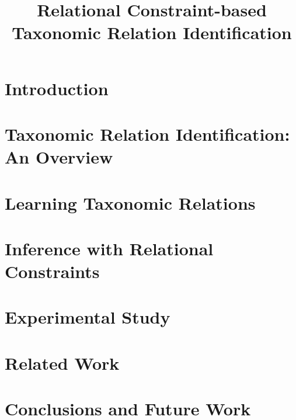 \documentclass[a4paper,11pt]{article}
\title{Relational Constraint-based Taxonomic Relation Identification}
\author{}
\date{}
\begin{document}
\maketitle

\newcommand{\ignore}[1]{}

\begin{abstract}

\end{abstract}

\section{Introduction}


\section{Taxonomic Relation Identification: An Overview}
\label{sec:overview-algorithm}


\section{Learning Taxonomic Relations}
\label{sec:learning}


\section{Inference with Relational Constraints}
\label{sec:inference}


\section{Experimental Study}
\label{sec:experiments}


\section{Related Work}
\label{sec:related-work}


\section{Conclusions and Future Work}
\label{sec:conclusions}




\end{document}
